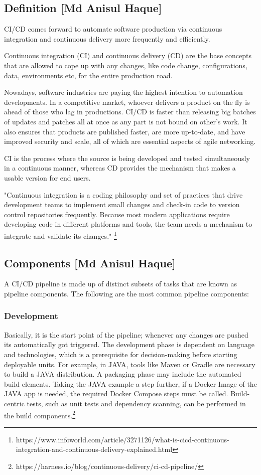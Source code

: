 \subsection{Definition [Md Anisul Haque]}
%
CI/CD comes forward to automate software production via continuous integration and continuous delivery more frequently and efficiently.

Continuous integration (CI) and continuous delivery (CD) are the base concepts that are allowed to cope up with any changes, like code change, configurations, data, environments etc, for the entire production road\cite{CD}.

Nowadays, software industries are paying the highest intention to automation developments. In a competitive market, whoever delivers a product on the fly is ahead of those who lag in productions. CI/CD is faster than releasing big batches of updates and patches all at once as any part is not bound on other's work. It also ensures that products are published faster, are more up-to-date, and have improved security and scale, all of which are essential aspects of agile networking.

CI is the process where the source is being developed and tested simultaneously in a continuous manner, whereas CD provides the mechanism that makes a usable version for end users\cite{CDHandsOn}.

"Continuous integration is a coding philosophy and set of practices that drive development teams to implement small changes and check-in code to version control repositories frequently. Because most modern applications require developing code in different platforms and tools, the team needs a mechanism to integrate and validate its changes." \footnote{https://www.infoworld.com/article/3271126/what-is-cicd-continuous-integration-and-continuous-delivery-explained.html}

%
\subsection{Components [Md Anisul Haque]}
%
A CI/CD pipeline is made up of distinct subsets of tasks that are known as pipeline components. The following are the most common pipeline components:

\subsubsection{Development}

Basically, it is the start point of the pipeline; whenever any changes are pushed its automatically got triggered. The development phase is dependent on language and technologies, which is a prerequisite for decision-making before starting deployable units. For example, in JAVA, tools like Maven or Gradle are necessary to build a JAVA distribution. A packaging phase may include the automated build elements. Taking the JAVA example a step further, if a Docker Image of the JAVA app is needed, the required Docker Compose steps must be called. Build-centric tests, such as unit tests and dependency scanning, can be performed in the build components.\footnote{https://harness.io/blog/continuous-delivery/ci-cd-pipeline/}



